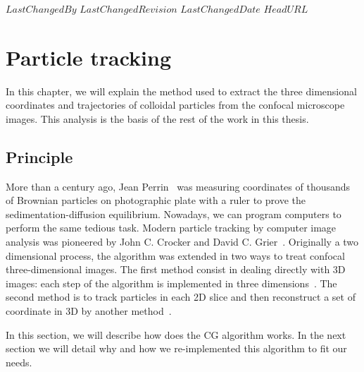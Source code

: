 \svnidlong
{$LastChangedBy$}
{$LastChangedRevision$}
{$LastChangedDate$}
{$HeadURL$}

\chapter{Particle tracking}
\label{ch:tracking}

In this chapter, we will explain the method used to extract the three dimensional coordinates and trajectories of colloidal particles from the confocal microscope images. This analysis is the basis of the rest of the work in this thesis.

\section{Principle}
More than a century ago, Jean Perrin~\citep{perrin} was measuring coordinates of thousands of Brownian particles on photographic plate with a ruler to prove the sedimentation-diffusion equilibrium. Nowadays, we can program computers to perform the same tedious task. Modern particle tracking by computer image analysis was pioneered by John C. Crocker and David C. Grier~\citep{crocker1996mdv}. Originally a two dimensional process, the algorithm was extended in two ways to treat confocal three-dimensional images. The first method consist in dealing directly with 3D images: each step of the algorithm is implemented in three dimensions~\citep{dinsmore2001tdc}. The second method is to track particles in each 2D slice and then reconstruct a set of coordinate in 3D by another method~\citep{vanblaaderen1995rss, Lu2007, Lu2008}.

In this section, we will describe how does the \ac{CG} algorithm works. In the next section we will detail why and how we re-implemented this algorithm to fit our needs.

